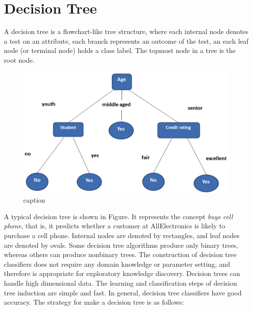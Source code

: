 \section{Decision Tree}
A decision tree is a flowchart-like tree structure, where each internal node denotes a test on an attribute, each branch represents an outcome of the test, an each leaf node (or terminal node) holds a class label. The topmost node in a tree is the root node.
\begin{figure}[ht!]
  \centering
  \includegraphics[scale=0.4]{arbol}
  \caption{caption}

\end{figure}
A typical decision tree is shown in Figure.  It represents the concept \textit{buys cell phone}, that is, it predicts whether a customer at AllElectronics is likely to purchase a cell phone.
Internal nodes are denoted by rectangles, and leaf nodes are denoted by ovals.  Some decision tree algorithms produce only binary trees, whereas others can produce nonbinary trees.
The construction of decision tree classifiers does not require any domain knowledge or parameter setting, and therefore is appropriate for exploratory knowledge discovery.  Decision trees can handle high dimensional data.  The learning and classification steps of decision tree induction are simple and fast.  In general, decision tree classifiers have good accuracy.
The strategy for make a decision tree is as follows:
